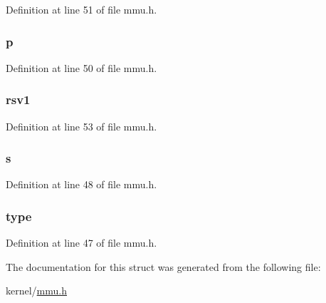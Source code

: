 Definition at line 51 of file mmu.\-h.

\hypertarget{structsegdesc_afca19e8f7fcc079e05083a7012c34ccf}{
\subsubsection[{p}]{ p}}\label{structsegdesc_afca19e8f7fcc079e05083a7012c34ccf}


Definition at line 50 of file mmu.\-h.

\hypertarget{structsegdesc_a3c18a496ce0a34acbeb84338e3021797}{
\subsubsection[{rsv1}]{ rsv1}}\label{structsegdesc_a3c18a496ce0a34acbeb84338e3021797}


Definition at line 53 of file mmu.\-h.

\hypertarget{structsegdesc_a35181190d39e3d895c0ab657aceabb54}{
\subsubsection[{s}]{ s}}\label{structsegdesc_a35181190d39e3d895c0ab657aceabb54}


Definition at line 48 of file mmu.\-h.

\hypertarget{structsegdesc_a4e4020c6e82bee6562d5bc3c1657cafe}{
\subsubsection[{type}]{ type}}\label{structsegdesc_a4e4020c6e82bee6562d5bc3c1657cafe}


Definition at line 47 of file mmu.\-h.



The documentation for this struct was generated from the following file\-:\begin{DoxyCompactItemize}
\item 
kernel/\hyperlink{mmu_8h}{mmu.\-h}\end{DoxyCompactItemize}
